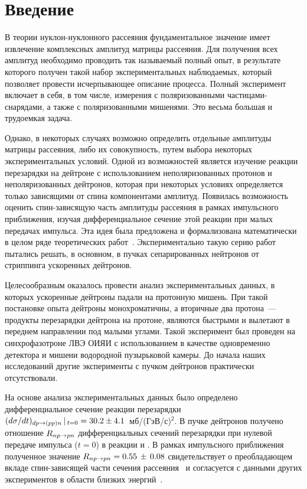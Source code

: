 \section{Введение}
В теории нуклон-нуклонного рассеяния фундаментальное значение имеет извлечение
комплексных амплитуд матрицы рассеяния. Для получения всех амплитуд необходимо
проводить так называемый полный опыт, в результате которого получен
такой набор экспериментальных наблюдаемых, который позволяет провести
исчерпывающее описание процесса. Полный эксперимент включает в себя, в том
числе, измерения с поляризованными частицами-снарядами, а также с
поляризованными мишенями. Это весьма большая и трудоемкая задача.

Однако, в некоторых случаях возможно определить отдельные амплитуды матрицы
рассеяния, либо их совокупность, путем выбора некоторых экспериментальных
условий. Одной из возможностей является изучение реакции перезарядки на
дейтроне \dpchex с использованием неполяризованных протонов и неполяризованных
дейтронов, которая при некоторых условиях определяется только зависящими от
спина компонентами амплитуд. Появилась возможность оценить спин-зависящую часть
амплитуды \np рассеяния в рамках импульсного приближения, изучая
дифференциальное сечение этой реакции при малых передачах импульса. Эта идея
была предложена и формализована математически в целом ряде теоретических
работ~\cite{pom51,chew50,dean72_2}. Экспериментально такую серию работ пытались
решать, в основном, в пучках сепарированных нейтронов от стриппинга ускоренных
дейтронов.

Целесообразным оказалось провести анализ экспериментальных данных, в которых
ускоренные дейтроны падали на протонную мишень. При такой постановке опыта
дейтроны монохроматичны, а вторичные два протона~--- продукты перезарядки
дейтрона на протоне, являются быстрыми и вылетают в переднем направлении под
малыми углами. Такой эксперимент был проведен на синхрофазотроне ЛВЭ ОИЯИ с
использованием в качестве одновременно детектора и мишени водородной пузырьковой
камеры. До начала наших исследований другие эксперименты с пучком дейтронов
практически отсутствовали.

На основе анализа экспериментальных данных было определено дифференциальное
сечение реакции перезарядки
$(d\sigma/dt)_{dp \rightarrow (pp)n}\,|\,_{t=0} = 30.2 \pm 4.1$~мб/(ГэВ/с)$^{2}$.
В пучке дейтронов получено отношение $R_{np \rightarrow pn}$ дифференциальных сечений
перезарядки при нулевой передаче импульса ($t=0$) в реакции \dpchex и \np. В
рамках импульсного приближения полученное значение $R_{np \rightarrow pn} = 0.55\,\pm\,0.08$
свидетельствует о преобладающем вкладе спин-зависящей части сечения \np
рассеяния~\cite{gla_mucha08} и согласуется с данными других экспериментов в
области близких энергий~\cite{shar09}.

